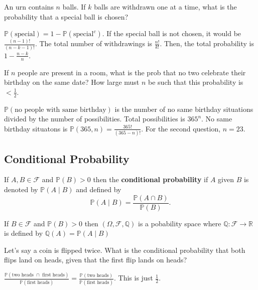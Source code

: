 \begin{eg}
	An urn contains \( n \) balls. If \( k \) balls are withdrawn one at a time, what is the probability that a special ball is chosen?
\end{eg}
\begin{explanation}
	\( \mathbb{P}(\text{special})  = 1 - \mathbb{P}(\text{special}^{c})\). If the special ball is not chosen, it would be \( \frac{(n-1)!}{(n-k-1)!} \). The total number of withdrawings is \( \frac{n!}{k!} \). Then, the total probability is \( 1-\frac{n-k}{n} \).
\end{explanation}

\begin{eg}
	If \( n \) people are present in a room, what is the prob that no two celebrate their birthday on the same date? How large must \( n \) be such that this probability is \( <\frac{1}{2} \).
\end{eg}
\begin{explanation}
	\( \mathbb{P}(\text{no people with same birthday}) \) is the number of no same birthday situations divided by the number of possibilities. Total possibilities is \( 365^n \). No same birthday situatons is \( \mathbb{P}(365,n) = \frac{365!}{(365-n)!} \). For the second question, \( n=23 \).
\end{explanation}

\subsection{Conditional Probability}

\begin{definition}
	If \( A,B \in \mathcal{F} \) and \( \mathbb{P}(B) > 0 \) then the \textbf{conditional probability} if \( A \) given \( B \) is denoted by \( \mathbb{P}(A\mid B) \) and defined by \[
		\mathbb{P}(A \mid B) = \frac{\mathbb{P}(A \cap B)}{\mathbb{P}(B)}
	.\] 
\end{definition}

\begin{theorem}
	If \( B \in \mathcal{F} \) and \( \mathbb{P}(B) > 0 \) then \( (\Omega, \mathcal{F}, \mathbb{Q}) \) is a pobability space where \( \mathbb{Q}: \mathcal{F} \to \mathbb{R} \) is defined by \( \mathbb{Q}(A) = \mathbb{P}(A \mid B) \)
\end{theorem}

\begin{eg}
	Let's say a coin is flipped twice. What is the conditional probability that both flips land on heads, given that the first flip lands on heads?
\end{eg}
\begin{explanation}
	\( \frac{\mathbb{P}(\text{two heads } \cap \text{ first heads})}{\mathbb{P}(\text{first heads})} = \frac{\mathbb{P}(\text{two heads})}{\mathbb{P}(\text{first heads})}\). This is just \( \frac{1}{2} \).
\end{explanation}

